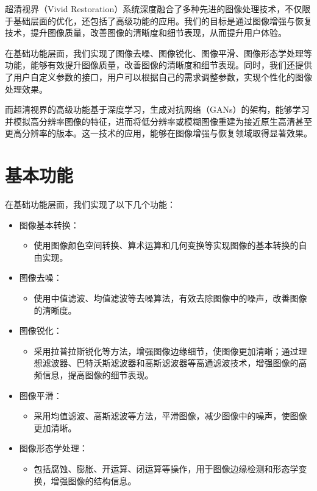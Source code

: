 \documentclass[UTF8,openany]{ctexbook}
\begin{document}
超清视界（Vivid Restoration）系统深度融合了多种先进的图像处理技术，不仅限于基础层面的优化，还包括了高级功能的应用。我们的目标是通过图像增强与恢复技术，提升图像质量，改善图像的清晰度和细节表现，从而提升用户体验。

在基础功能层面，我们实现了图像去噪、图像锐化、图像平滑、图像形态学处理等功能，能够有效提升图像质量，改善图像的清晰度和细节表现。同时，我们还提供了用户自定义参数的接口，用户可以根据自己的需求调整参数，实现个性化的图像处理效果。

而超清视界的高级功能基于深度学习，生成对抗网络（GANs）的架构，能够学习并模拟高分辨率图像的特征，进而将低分辨率或模糊图像重建为接近原生高清甚至更高分辨率的版本。这一技术的应用，能够在图像增强与恢复领域取得显著效果。

\section{基本功能}

在基础功能层面，我们实现了以下几个功能：

\begin{itemize}
  \item 图像基本转换：
  \begin{itemize}
      \item 使用图像颜色空间转换、算术运算和几何变换等实现图像的基本转换的自由实现。
  \end{itemize}
  
  \item 图像去噪：
  \begin{itemize}
      \item 使用中值滤波、均值滤波等去噪算法，有效去除图像中的噪声，改善图像的清晰度。
  \end{itemize}
  
  \item 图像锐化：
  \begin{itemize}
      \item 采用拉普拉斯锐化等方法，增强图像边缘细节，使图像更加清晰；通过理想滤波器、巴特沃斯滤波器和高斯滤波器等高通滤波技术，增强图像的高频信息，提高图像的细节表现。
  \end{itemize}
  
  \item 图像平滑：
  \begin{itemize}
      \item 采用均值滤波、高斯滤波等方法，平滑图像，减少图像中的噪声，使图像更加清晰。
  \end{itemize}
  
  \item 图像形态学处理：
  \begin{itemize}
      \item 包括腐蚀、膨胀、开运算、闭运算等操作，用于图像边缘检测和形态学变换，增强图像的结构信息。
  \end{itemize}
\end{itemize}
\end{document}
